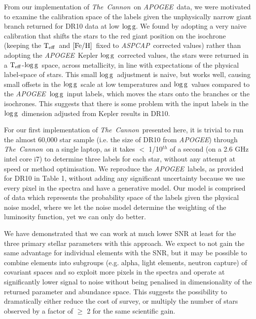 \documentclass[12pt, preprint]{aastex}
\newcommand{\teff}{\mbox{$\rm T_{eff}$}}
\newcommand{\feh}{\mbox{$\rm [Fe/H]$}}
\newcommand{\logg}{\mbox{$\rm \log g$}}
\newcommand{\tc}{\textsl{The~Cannon}}
\newcommand{\apogee}{\textsl{APOGEE}}
\newcommand{\aspcap}{\textsl{ASPCAP}}
\begin{document}
From our implementation of \tc\ on \apogee\ data, we were motivated to examine the calibration space of the labels given the unphysically narrow giant branch returned for DR10 data at low \logg. We found by adopting a very naive calibration that shifts the stars to the red giant position on the isochrone (keeping the \teff\ and \feh\ fixed to \aspcap\ corrected values) rather than adopting the \apogee\ Kepler \logg\ corrected values, the stars were returned in a \teff-\logg\ space, across metallicity, in line with expectations of the physical label-space of stars. This small \logg\ adjustment is naive, but works well, causing small offsets in the \logg\ scale at low temperatures and \logg\ values compared to the \apogee\ \logg\ input labels, which moves the stars onto the branches or the isochrones. This suggests that there is some problem with the input labels in the \logg\ dimension adjusted from Kepler results in DR10. 

 For our first implementation of \tc\ presented here, it is trivial to run the almost 60,000 star sample (i.e. the size of DR10 from \apogee) through \tc\ on a single laptop, as it takes $<$ 1/10$^{th}$ of a second (on a 2.6 GHz intel core i7) to determine three labels for each star, without any attempt at speed or method optimisation. We reproduce the \apogee\ labels, as provided for DR10 in Table 1, without adding any significant uncertainty because we use every pixel in the spectra and have a generative model. Our model is comprised of data which represents the probability space of the labels given the physical noise model,  where we let the noise model determine the weighting of the luminosity function, yet we can only do better.  %

We have demonstrated that we can work at much lower SNR at least for the three primary stellar parameters with this approach. We expect to not gain the same advantage for individual elements with the SNR, but it may be possible to combine elements into subgroups (e.g. alpha, light elements, neutron capture) of covariant spaces \citep[e.g.][]{Ting2012} and so exploit more pixels in the spectra and operate at significantly lower signal to noise without being penalised in dimensionality of the returned parameter and abundance space. This suggests the possibility to dramatically either reduce the cost of survey, or multiply the number of stars observed by a factor of $\ge$ 2 for the same scientific gain. 
\end{document}
